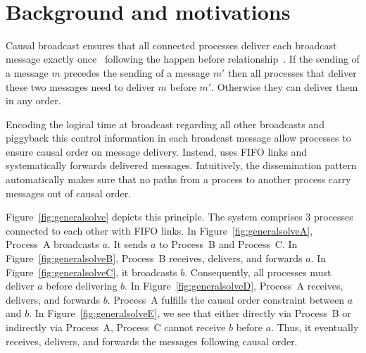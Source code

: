 
\begin{figure*}
  \begin{center}
    \hspace{40pt}
    \hspace{40pt}
    \\
    \hspace{40pt}
    \caption{\label{fig:generalsolve}Causal broadcast~\cite{friedman2004causal}
      ensures causal order.}
  \end{center}
\end{figure*}


\section{Background and motivations}
\label{sec:motivations}

Causal broadcast ensures that all connected processes deliver each broadcast
message exactly once~\cite{hadzilacos1994modular} following the happen before
relationship~\cite{lamport1978time}. If the sending of a message $m$ precedes
the sending of a message $m'$ then all processes that deliver these two messages
need to deliver $m$ before $m'$. Otherwise they can deliver them in any order.

Encoding the logical time at broadcast regarding all other broadcasts and
piggyback this control information in each broadcast message allow processes to
ensure causal order on message delivery. Instead, \cite{friedman2004causal}
uses FIFO links and systematically forwards delivered messages.  Intuitively,
the dissemination pattern automatically makes sure that no paths from a process
to another process carry messages out of causal order.

Figure~\ref{fig:generalsolve} depicts this principle. The system comprises 3
processes connected to each other with FIFO links.  In
Figure~\ref{fig:generalsolveA}, Process~A broadcasts $a$. It sends $a$ to
Process~B and Process~C. In Figure~\ref{fig:generalsolveB}, Process~B receives,
delivers, and forwards $a$. In Figure~\ref{fig:generalsolveC}, it broadcasts
$b$. Consequently, all processes must deliver $a$ before delivering $b$. In
Figure~\ref{fig:generalsolveD}, Process~A receives, delivers, and forwards
$b$. Process~A fulfills the causal order constraint between $a$ and $b$. In
Figure~\ref{fig:generalsolveE}, we see that either directly via Process~B or
indirectly via Process~A, Process~C cannot receive $b$ before $a$. Thus, it
eventually receives, delivers, and forwards the messages following causal order.

